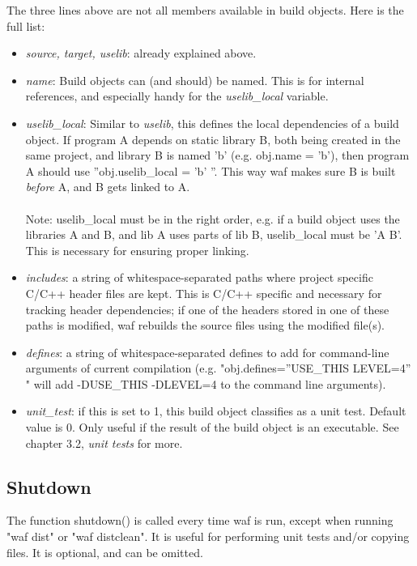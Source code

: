 \documentclass[a4paper,10pt]{article}
\begin{document}
\vspace{10mm}
The three lines above are not all members available in build objects. Here is the full list:
\begin{itemize}

\item \emph{source, target, uselib}: already explained above.

\item \emph{name}: Build objects can (and should) be named. This is for internal references, and especially handy for the \emph{uselib\_local} variable.

\item \emph{uselib\_local}: Similar to \emph{uselib}, this defines the local dependencies of a build object. If program A depends on static library B, both being created in the same project, and library B is named 'b' (e.g. obj.name = 'b'), then program A should use ''obj.uselib\_local = 'b' ''. This way waf makes sure B is built \emph{before} A, and B gets linked to A.\\
\\
Note: uselib\_local must be in the right order, e.g. if a build object uses the libraries A and B, and lib A uses parts of lib B, uselib\_local must be 'A B'. This is necessary for ensuring proper linking.

\item \emph{includes}: a string of whitespace-separated paths where project specific C/C++ header files are kept. This is C/C++ specific and necessary for tracking header dependencies; if one of the headers stored in one of these paths is modified, waf rebuilds the source files using the modified file(s).

\item \emph{defines}: a string of whitespace-separated defines to add for command-line arguments of current compilation (e.g. "obj.defines=''USE_THIS LEVEL=4'' " will add -DUSE_THIS -DLEVEL=4 to the command line arguments).

\item \emph{unit\_test}: if this is set to 1, this build object classifies as a unit test. Default value is 0. Only useful if the result of the build object is an executable. See chapter 3.2, \emph{unit tests} for more.

\end{itemize}

\subsection{Shutdown}
The function shutdown() is called every time waf is run, except when running "waf dist" or "waf distclean". It is useful for performing unit tests and/or copying files. It is optional, and can be omitted.
\end{document}
